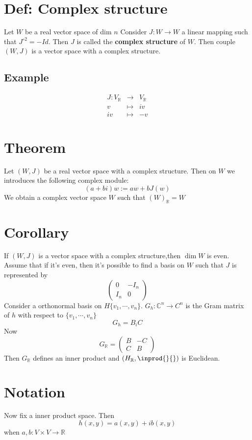 \documentclass{book}
\begin{document}
\section{Def: Complex structure}
Let $W$ be a real vector space of dim $n$ Consider $J:W\rightarrow W$ a linear mapping such that $J^{\circ 2}=-Id$. Then $J$ is called the \textbf{complex structure} of $W$. Then couple $(W,J)$ is a vector space with a complex structure.
\subsection*{Example}$$\begin{aligned}
    J:V_\mathbb{R}&\rightarrow & V_\mathbb{R}\\
    v&\mapsto&iv\\
    iv&\mapsto&-v
\end{aligned}$$
\section{Theorem}
Let $(W,J)$ be a real vector space with a complex structure. Then on $W$ we introduces the following complex module:
$$(a+bi)w:=aw+bJ(w)$$
We obtain a complex vector space $W$ such that $(W)_\mathbb{R}=W$
\section{Corollary}
If $(W,J)$ is a vector space with a complex structure,then $\dim W$ is even. Assume that if it's even, then it's possible to find a basis on $W$ such that $J$ is represented by$$\begin{pmatrix}
    0&-I_n\\I_n&0
\end{pmatrix}$$
Consider a orthonormal basis on $H\{v_1,\cdots, v_n\}$. $G_h:\mathbb{C}^n\rightarrow C^n$ is the Gram matrix of $h$ with respect to $\{v_1,\cdots,v_n\}$ $$G_h=B_iC$$ Now$$G_\mathbb{R}=\begin{pmatrix}
    B&-C\\C&B
\end{pmatrix}$$
Then $G_\mathbb{R}$ defines an inner product and $(H_\mathbb{R},\inprod{}{})$ is Euclidean.
\section{Notation}
Now fix a inner product space. Then $$h(x,y)=a(x,y)+ib(x,y)$$when $a,b: V\times V\rightarrow \mathbb{R}$
\end{document}
